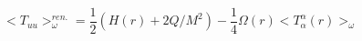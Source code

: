 \begin{equation}
<T_{uu}>^{ren.}_{\omega}=\frac{1}{2}(H(r)+2Q/M^{2})-\frac{1}{4}\Omega(r)
<T^{\alpha}_{\alpha}(r)>_{\omega}
\label{7}\end{equation}

